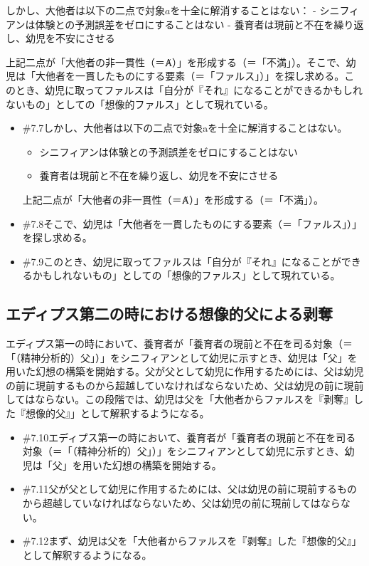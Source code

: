 しかし、大他者は以下の二点で対象\(a\)を十全に解消することはない： -
シニフィアンは体験との予測誤差をゼロにすることはない -
養育者は現前と不在を繰り返し、幼児を不安にさせる

上記二点が「大他者の非一貫性（＝Ⱥ）」を形成する（＝「不満」）。そこで、幼児は「大他者を一貫したものにする要素（＝「ファルス」）」を探し求める。このとき、幼児に取ってファルスは「自分が『それ』になることができるかもしれないもの」としての「想像的ファルス」として現れている。

\begin{note}{}
  \begin{itemize}
    \tightlist
    \item{\#7.7}しかし、大他者は以下の二点で対象aを十全に解消することはない。
      \begin{itemize}
        \tightlist
        \item シニフィアンは体験との予測誤差をゼロにすることはない
        \item 養育者は現前と不在を繰り返し、幼児を不安にさせる
      \end{itemize}上記二点が「大他者の非一貫性（＝Ⱥ）」を形成する（＝「不満」）。
    \item{\#7.8}そこで、幼児は「大他者を一貫したものにする要素（＝「ファルス」）」を探し求める。
    \item{\#7.9}このとき、幼児に取ってファルスは「自分が『それ』になることができるかもしれないもの」としての「想像的ファルス」として現れている。
  \end{itemize}
\end{note}

\subsection{エディプス第二の時における想像的父による剥奪}\label{ux30a8ux30c7ux30a3ux30d7ux30b9ux7b2cux4e8cux306eux6642ux306bux304aux3051ux308bux60f3ux50cfux7684ux7236ux306bux3088ux308bux5265ux596a}

エディプス第一の時において、養育者が「養育者の現前と不在を司る対象（＝「（精神分析的）父」）」をシニフィアンとして幼児に示すとき、幼児は「父」を用いた幻想の構築を開始する。父が父として幼児に作用するためには、父は幼児の前に現前するものから超越していなければならないため、父は幼児の前に現前してはならない。この段階では、幼児は父を「大他者からファルスを『剥奪』した『想像的父』」として解釈するようになる。

\begin{note}{}
  \begin{itemize}
    \tightlist
    \item{\#7.10}エディプス第一の時において、養育者が「養育者の現前と不在を司る対象（＝「（精神分析的）父」）」をシニフィアンとして幼児に示すとき、幼児は「父」を用いた幻想の構築を開始する。
    \item{\#7.11}父が父として幼児に作用するためには、父は幼児の前に現前するものから超越していなければならないため、父は幼児の前に現前してはならない。
    \item{\#7.12}まず、幼児は父を「大他者からファルスを『剥奪』した『想像的父』」として解釈するようになる。
  \end{itemize}
\end{note}

